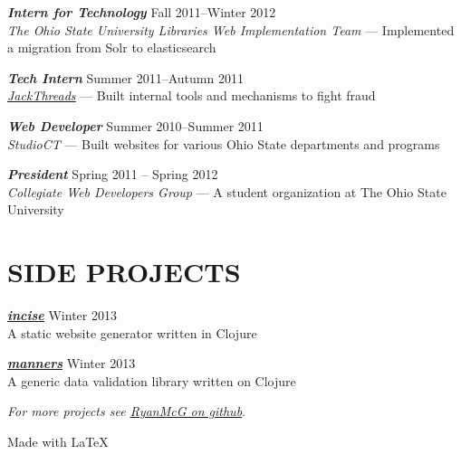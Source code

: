 \documentclass[line,letterpaper]{resume}
\begin{document}
\begin{resume}
    {\sl\textbf{Intern for Technology}} \hfill Fall 2011--Winter 2012\\
    \emph{The Ohio State University Libraries Web Implementation Team} --- Implemented a migration from Solr to elasticsearch
    \vspace{-6pt}

    {\sl\textbf{Tech Intern}} \hfill Summer 2011--Autumn 2011\\
    \emph{\underline{\href{http://www.jackthreads.com/}{JackThreads}}}
    --- Built internal tools and mechanisms to fight fraud
    \vspace{-6pt}

    {\sl\textbf{Web Developer}} \hfill Summer 2010--Summer 2011\\
    \emph{StudioCT} --- Built websites for various Ohio State departments and programs
    \vspace{-6pt}

    {\sl\textbf{President}} \hfill Spring 2011 -- Spring 2012\\
    \emph{Collegiate Web Developers Group} --- A student organization at The
    Ohio State University
    \vspace{-6pt}

    \section{\uppercase{Side Projects}}

    {\sl\textbf{\underline{\href{https://www.ryanmcg.com/incise}{incise}}}}
    \hfill Winter 2013\\
    A static website generator written in Clojure
    \vspace{-6pt}

    {\sl\textbf{\underline{\href{https://www.ryanmcg.com/manners}{manners}}}}
    \hfill Winter 2013\\
    A generic data validation library written on Clojure
    \vspace{-3pt}

    \hfill \emph{For more projects see
    \underline{\href{https://github.com/RyanMcG}{RyanMcG on github}}}.

    \vspace{-15pt}

\end{resume}

\vspace{20pt}

\hfill Made with \LaTeX{}
\end{document}
